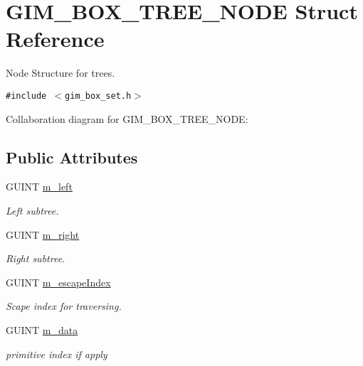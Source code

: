 \hypertarget{struct_g_i_m___b_o_x___t_r_e_e___n_o_d_e}{
\section{GIM\_\-BOX\_\-TREE\_\-NODE Struct Reference}
\label{struct_g_i_m___b_o_x___t_r_e_e___n_o_d_e}
}
Node Structure for trees.  


{\tt \#include $<$gim\_\-box\_\-set.h$>$}

Collaboration diagram for GIM\_\-BOX\_\-TREE\_\-NODE:\subsection*{Public Attributes}
\begin{CompactItemize}
\item 
\hypertarget{struct_g_i_m___b_o_x___t_r_e_e___n_o_d_e_6714d74e7c3f7b51c5fdd06e7b93721a}{
GUINT \hyperlink{struct_g_i_m___b_o_x___t_r_e_e___n_o_d_e_6714d74e7c3f7b51c5fdd06e7b93721a}{m\_\-left}}
\label{struct_g_i_m___b_o_x___t_r_e_e___n_o_d_e_6714d74e7c3f7b51c5fdd06e7b93721a}

\begin{CompactList}\small\item\em Left subtree. \item\end{CompactList}\item 
\hypertarget{struct_g_i_m___b_o_x___t_r_e_e___n_o_d_e_6ee254a3c0101d107a45ea9add325723}{
GUINT \hyperlink{struct_g_i_m___b_o_x___t_r_e_e___n_o_d_e_6ee254a3c0101d107a45ea9add325723}{m\_\-right}}
\label{struct_g_i_m___b_o_x___t_r_e_e___n_o_d_e_6ee254a3c0101d107a45ea9add325723}

\begin{CompactList}\small\item\em Right subtree. \item\end{CompactList}\item 
\hypertarget{struct_g_i_m___b_o_x___t_r_e_e___n_o_d_e_5a112d2bd3fcfb2699964f94d1fcfbcd}{
GUINT \hyperlink{struct_g_i_m___b_o_x___t_r_e_e___n_o_d_e_5a112d2bd3fcfb2699964f94d1fcfbcd}{m\_\-escapeIndex}}
\label{struct_g_i_m___b_o_x___t_r_e_e___n_o_d_e_5a112d2bd3fcfb2699964f94d1fcfbcd}

\begin{CompactList}\small\item\em Scape index for traversing. \item\end{CompactList}\item 
\hypertarget{struct_g_i_m___b_o_x___t_r_e_e___n_o_d_e_bba76fb81b6f50d11a0dccec69d0feec}{
GUINT \hyperlink{struct_g_i_m___b_o_x___t_r_e_e___n_o_d_e_bba76fb81b6f50d11a0dccec69d0feec}{m\_\-data}}
\label{struct_g_i_m___b_o_x___t_r_e_e___n_o_d_e_bba76fb81b6f50d11a0dccec69d0feec}

\begin{CompactList}\small\item\em primitive index if apply \item\end{CompactList}\end{CompactItemize}


